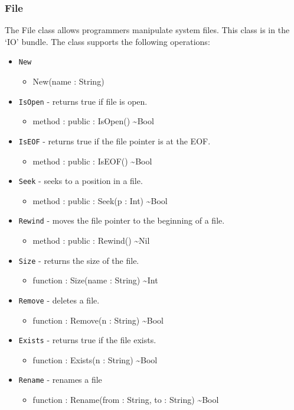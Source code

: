 \documentclass[11pt]{article}
\begin{document}
\subsubsection{File}
The File class allows programmers manipulate system files.  This class
is in the `IO' bundle.  The class supports the following operations:
\begin{itemize}
\item \texttt{New}
  \begin{itemize}
  \item New(name : String)
  \end{itemize}
\item \texttt{IsOpen} - returns true if file is open.
  \begin{itemize}
  \item method : public : IsOpen() \textasciitilde Bool
  \end{itemize}
\item \texttt{IsEOF} - returns true if the file pointer is at the EOF.
  \begin{itemize}
  \item method : public : IsEOF() \textasciitilde Bool
  \end{itemize}
\item \texttt{Seek} - seeks to a position in a file.
  \begin{itemize}
  \item method : public : Seek(p : Int) \textasciitilde Bool
  \end{itemize}
\item \texttt{Rewind} - moves the file pointer to the beginning of a
  file.
  \begin{itemize}
  \item method : public : Rewind() \textasciitilde Nil
  \end{itemize}
\item \texttt{Size} - returns the size of the file.
  \begin{itemize}
  \item function : Size(name : String) \textasciitilde Int
  \end{itemize}
\item \texttt{Remove} - deletes a file.
  \begin{itemize}
  \item function : Remove(n : String) \textasciitilde Bool
  \end{itemize}
\item \texttt{Exists} - returns true if the file exists.
  \begin{itemize}
  \item function : Exists(n : String) \textasciitilde Bool
  \end{itemize}
\item \texttt{Rename} - renames a file
  \begin{itemize}
  \item function : Rename(from : String, to : String) \textasciitilde Bool
  \end{itemize}
\end{itemize}
\end{document}
